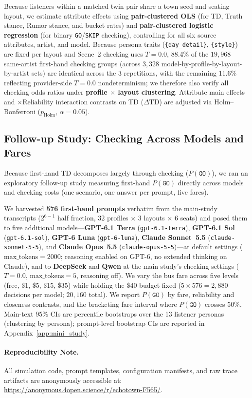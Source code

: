 Because listeners within a matched twin pair share a town seed and seating layout, we estimate attribute effects using \textbf{pair-clustered OLS} (for TD, Truth stance, Rumor stance, and bucket rates) and \textbf{pair-clustered logistic regression} (for binary \texttt{GO}/\texttt{SKIP} checking), controlling for all six source attributes, artist, and model. Because persona traits (\texttt{\{day\_detail\}}, \texttt{\{style\}}) are fixed per layout and Scene~2 checking uses $T=0.0$, 88.4\% of the $19{,}968$ same-artist first-hand checking groups (across $3{,}328$ model-by-profile-by-layout-by-artist sets) are identical across the 3 repetitions, with the remaining 11.6\% reflecting provider-side $T=0.0$ nondeterminism; we therefore also verify all checking odds ratios under \textbf{profile $\times$ layout clustering}. Attribute main effects and $\times\text{Reliability}$ interaction contrasts on TD ($\Delta\text{TD}$) are adjusted via Holm--Bonferroni ($p_{\text{Holm}}$, $\alpha = 0.05$).

\subsection{Follow-up Study: Checking Across Models and Fares}
\label{sec:followup}
Because first-hand TD decomposes largely through checking ($P(\texttt{GO})$), we ran an exploratory follow-up study measuring first-hand $P(\texttt{GO})$ directly across models and checking costs (one scenario, one answer per prompt, five fares).

We harvested \textbf{576 first-hand prompts} verbatim from the main-study transcripts ($2^{6-1}$ half fraction, 32 profiles $\times$ 3 layouts $\times$ 6 seats) and posed them to five additional models---\textbf{GPT-6.1 Terra} (\texttt{gpt-6.1-terra}), \textbf{GPT-6.1 Sol} (\texttt{gpt-6.1-sol}), \textbf{GPT-6 Luna} (\texttt{gpt-6-luna}), \textbf{Claude Sonnet~5.5} (\texttt{claude-sonnet-5-5}), and \textbf{Claude Opus~5.5} (\texttt{claude-opus-5-5})---at default settings ($\text{max\_tokens}=2000$; reasoning enabled on GPT-6, no extended thinking on Claude), and to \textbf{DeepSeek} and \textbf{Qwen} at the main study's checking settings ($T=0.0$, $\text{max\_tokens}=5$, reasoning off). We vary the bus fare across five levels (free, \$1, \$5, \$15, \$35) while holding the \$40 budget fixed ($5 \times 576 = 2{,}880$ decisions per model; $20{,}160$ total). We report $P(\texttt{GO})$ by fare, reliability and closeness contrasts, and the bracketing fare interval where $P(\texttt{GO})$ crosses 50\%. Main-text 95\% CIs are percentile bootstraps over the 13 listener personas (clustering by persona); prompt-level bootstrap CIs are reported in Appendix~\ref{app:mini_study}.

\paragraph{Reproducibility Note.} All simulation code, prompt templates, configuration manifests, and raw trace artifacts are anonymously accessible at: \url{https://anonymous.4open.science/r/echotown-F565/}.
